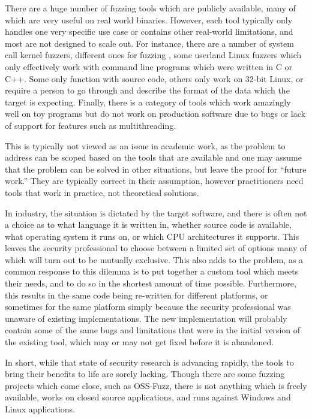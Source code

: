 There are a huge number of fuzzing tools which are publicly available, many of
which are very useful on real world binaries.\cite{afl,aflosx,winafl,peach22,syzkaller,ossfuzz,driller,radamsa,ni,zzuf,synfuzz,brundlefuzz,honggfuzz,kafl}  However, each tool
typically only handles one very specific use case or contains other real-world limitations, and most are not designed to scale
out.  For instance, there are a number of system call kernel fuzzers, different ones for
fuzzing \IOCTLs{}, some userland Linux fuzzers which only effectively work with
command line programs which were written in C or C++.  Some only function with
source code, others only work on 32-bit Linux, or require a person to go
through and describe the format of the data which the target is
expecting.  Finally, there is a category of tools which work amazingly well
on toy programs but do not work on production software due to bugs or lack of
support for features such as multithreading.

This is typically not viewed as an issue in academic work, as the problem to address can be
scoped based on the tools that are available and one may assume that the problem can
be solved in other situations, but leave the proof for ``future work.''  They
are typically correct in their assumption, however practitioners need tools
that work in practice, not theoretical solutions.

In industry, the situation is dictated by the target software,
and there is often not a choice as to what language it is
written in, whether source code is available, what operating system it runs
on, or which CPU architectures it supports. This leaves the security
professional to choose between a limited set of options many of which will
turn out to be mutually exclusive. This also adds to the problem, as a common
response to this dilemma is to put together a custom tool which meets their
needs, and to do so in the shortest amount of time possible.  Furthermore,
this results in the same code being re-written for different platforms, or
sometimes for the same platform simply because the security professional was
unaware of existing implementations.  The new implementation will probably
contain some of the same bugs and limitations that were in the initial
version of the existing tool, which may or may not get fixed before it is
abandoned.

In short, while that state of security research is advancing rapidly, the
tools to bring their benefits to life are sorely lacking.  Though there are some
fuzzing projects which come close, such as OSS-Fuzz,\cite{ossfuzz} there
is not anything which is freely available, works on closed source applications,
and runs against Windows and Linux applications.
